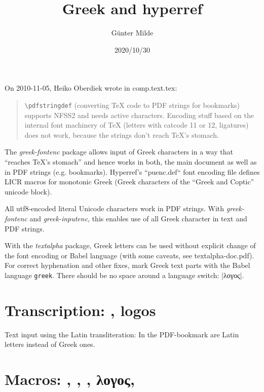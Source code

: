 \documentclass{article}
\newcommand{\cs}[1]{\texttt{\textbackslash #1}}
\begin{document}
\title{Greek and hyperref}
\author{Günter Milde}
\date{2020/10/30}
\maketitle

\tableofcontents

\noindent
On 2010-11-05, Heiko Oberdiek wrote in comp.text.tex:
%
\begin{quote}
   \cs{pdfstringdef} (converting TeX code to PDF strings for
   bookmarks) supports NFSS2 and needs active characters. Encoding
   stuff based on the internal font machinery of TeX (letters with
   catcode 11 or 12, ligatures) does not work, because the strings
   don't reach TeX's stomach.
\end{quote}
%
The \emph{greek-fontenc} package allows input of Greek characters in a way
that ``reaches TeX's stomach'' and hence works in both, the main document as
well as in PDF strings (e.g. bookmarks). Hyperref's ``puenc.def`` font
encoding file defines LICR macros for monotonic Greek (Greek characters of
the ``Greek and Coptic'' unicode block).

All utf8-encoded literal Unicode characters work in PDF strings. With
\emph{greek-fontenc} and \emph{greek-inputenc}, this enables use of all
Greek character in text and PDF strings.

With the \emph{textalpha} package, Greek letters can be used without
explicit change of the font encoding or Babel language (with some caveats,
see textalpha-doc.pdf).
For correct hyphenation and other fixes, mark Greek text parts with the
Babel language \texttt{greek}. There should be no space around a language
switch: |\foreignlanguage{greek}{λογος}|.

\section{Transcription: , \foreignlanguage{greek}{logos}}

Text input using the Latin transliteration:
In the PDF-bookmark are Latin letters instead of Greek ones.

\section{Macros:
	 \foreignlanguage{greek}{%
           \textlambda\textomicron\textgamma\textomicron\textfinalsigma},
	 \textlambda\textomicron\textgamma\textomicron\textfinalsigma{},
         \lambda\omicron\gamma\omicron\finalsigma{},
	 λογος,
	}
\end{document}
